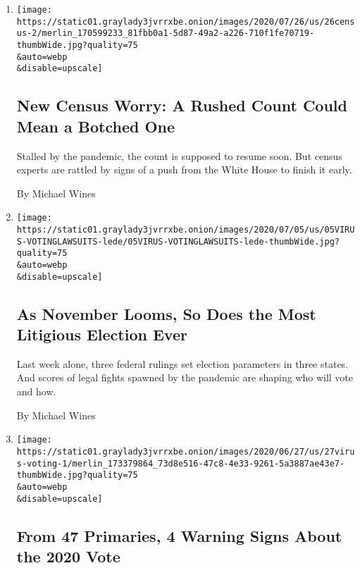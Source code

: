 \begin{enumerate}
\def\labelenumi{\arabic{enumi}.}
\item
  \href{/2020/07/28/us/trump-census.html}{}

  \texttt{[image: https://static01.graylady3jvrrxbe.onion/images/2020/07/26/us/26census-2/merlin\_170599233\_81fbb0a1-5d87-49a2-a226-710f1fe70719-thumbWide.jpg?quality=75\\\&auto=webp\\\&disable=upscale]}

  \hypertarget{new-census-worry-a-rushed-count-could-mean-a-botched-one}{%
  \subsection{New Census Worry: A Rushed Count Could Mean a Botched
  One}\label{new-census-worry-a-rushed-count-could-mean-a-botched-one}}

  Stalled by the pandemic, the count is supposed to resume soon. But
  census experts are rattled by signs of a push from the White House to
  finish it early.

  By Michael Wines
\item
  \href{/2020/07/07/us/2020-election-laws.html}{}

  \texttt{[image: https://static01.graylady3jvrrxbe.onion/images/2020/07/05/us/05VIRUS-VOTINGLAWSUITS-lede/05VIRUS-VOTINGLAWSUITS-lede-thumbWide.jpg?quality=75\\\&auto=webp\\\&disable=upscale]}

  \hypertarget{as-november-looms-so-does-the-most-litigious-election-ever}{%
  \subsection{As November Looms, So Does the Most Litigious Election
  Ever}\label{as-november-looms-so-does-the-most-litigious-election-ever}}

  Last week alone, three federal rulings set election parameters in
  three states. And scores of legal fights spawned by the pandemic are
  shaping who will vote and how.

  By Michael Wines
\item
  \href{/2020/06/27/us/2020-primary-election-voting.html}{}

  \texttt{[image: https://static01.graylady3jvrrxbe.onion/images/2020/06/27/us/27virus-voting-1/merlin\_173379864\_73d8e516-47c8-4e33-9261-5a3887ae43e7-thumbWide.jpg?quality=75\\\&auto=webp\\\&disable=upscale]}

  \hypertarget{from-47-primaries-4-warning-signs-about-the-2020-vote}{%
  \subsection{From 47 Primaries, 4 Warning Signs About the 2020
  Vote}\label{from-47-primaries-4-warning-signs-about-the-2020-vote}}


\end{enumerate}

